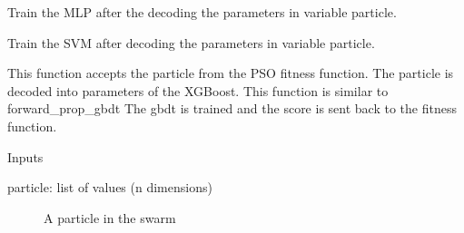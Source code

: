 \documentclass[letterpaper,10pt,english]{sphinxmanual}
\begin{document}
\begin{fulllineitems}
\begin{fulllineitems}
\end{fulllineitems}


\begin{fulllineitems}
\label{\detokenize{index:pspso.pspso.forward_prop_mlp}}
Train the MLP after the decoding the parameters in variable particle.

\end{fulllineitems}


\begin{fulllineitems}
\label{\detokenize{index:pspso.pspso.forward_prop_svm}}
Train the SVM after decoding the parameters in variable particle.

\end{fulllineitems}


\begin{fulllineitems}
\label{\detokenize{index:pspso.pspso.forward_prop_xgboost}}
This function accepts the particle from the PSO fitness function.
The particle is decoded into parameters of the XGBoost.
This function is similar to forward\_prop\_gbdt
The gbdt is trained and the score is sent back to the fitness function.

Inputs
\begin{description}
\item[{particle: list of values (n dimensions)}] \leavevmode
A particle in the swarm


\end{description}
\end{fulllineitems}
\end{fulllineitems}
\end{document}
